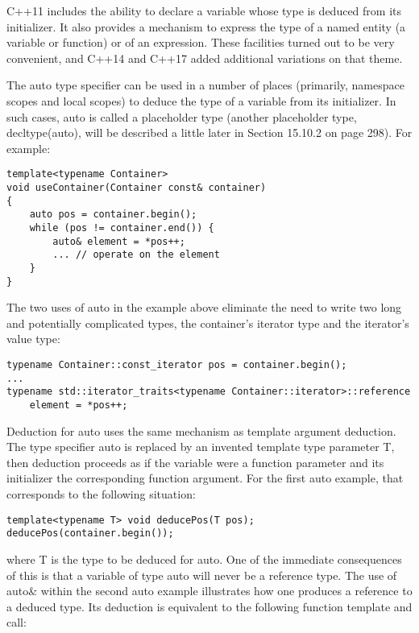 
C++11 includes the ability to declare a variable whose type is deduced from its initializer. It also provides a mechanism to express the type of a named entity (a variable or function) or of an expression. These facilities turned out to be very convenient, and C++14 and C++17 added additional variations on that theme.


The auto type specifier can be used in a number of places (primarily, namespace scopes and local scopes) to deduce the type of a variable from its initializer. In such cases, auto is called a placeholder type (another placeholder type, decltype(auto), will be described a little later in Section 15.10.2 on page 298). For example:

\begin{lstlisting}[style=styleCXX]
template<typename Container>
void useContainer(Container const& container)
{
	auto pos = container.begin();
	while (pos != container.end()) {
		auto& element = *pos++;
		... // operate on the element
	}
}
\end{lstlisting}

The two uses of auto in the example above eliminate the need to write two long and potentially complicated types, the container’s iterator type and the iterator’s value type:

\begin{lstlisting}[style=styleCXX]
typename Container::const_iterator pos = container.begin();
...
typename std::iterator_traits<typename Container::iterator>::reference
	element = *pos++;
\end{lstlisting}

Deduction for auto uses the same mechanism as template argument deduction. The type specifier auto is replaced by an invented template type parameter T, then deduction proceeds as if the variable were a function parameter and its initializer the corresponding function argument. For the first auto example, that corresponds to the following situation:

\begin{lstlisting}[style=styleCXX]
template<typename T> void deducePos(T pos);
deducePos(container.begin());
\end{lstlisting}

where T is the type to be deduced for auto. One of the immediate consequences of this is that a variable of type auto will never be a reference type. The use of auto\& within the second auto example illustrates how one produces a reference to a deduced type. Its deduction is equivalent to the following function template and call:


